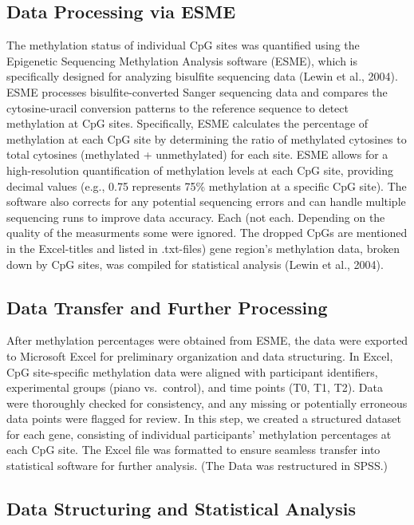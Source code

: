 \documentclass[
]{agujournal2019}
\begin{document}
\subsection{Data Processing via ESME}\label{data-processing-via-esme}

The methylation status of individual CpG sites was quantified using the
Epigenetic Sequencing Methylation Analysis software (ESME), which is
specifically designed for analyzing bisulfite sequencing data (Lewin et
al., 2004). ESME processes bisulfite-converted Sanger sequencing data
and compares the cytosine-uracil conversion patterns to the reference
sequence to detect methylation at CpG sites. Specifically, ESME
calculates the percentage of methylation at each CpG site by determining
the ratio of methylated cytosines to total cytosines (methylated +
unmethylated) for each site. ESME allows for a high-resolution
quantification of methylation levels at each CpG site, providing decimal
values (e.g., 0.75 represents 75\% methylation at a specific CpG site).
The software also corrects for any potential sequencing errors and can
handle multiple sequencing runs to improve data accuracy. Each (not
each. Depending on the quality of the measurments some were ignored. The
dropped CpGs are mentioned in the Excel-titles and listed in .txt-files)
gene region's methylation data, broken down by CpG sites, was compiled
for statistical analysis (Lewin et al., 2004).

\subsection{Data Transfer and Further
Processing}\label{data-transfer-and-further-processing}

After methylation percentages were obtained from ESME, the data were
exported to Microsoft Excel for preliminary organization and data
structuring. In Excel, CpG site-specific methylation data were aligned
with participant identifiers, experimental groups (piano vs.~control),
and time points (T0, T1, T2). Data were thoroughly checked for
consistency, and any missing or potentially erroneous data points were
flagged for review. In this step, we created a structured dataset for
each gene, consisting of individual participants' methylation
percentages at each CpG site. The Excel file was formatted to ensure
seamless transfer into statistical software for further analysis. (The
Data was restructured in SPSS.)

\subsection{Data Structuring and Statistical
Analysis}\label{data-structuring-and-statistical-analysis}
\end{document}
